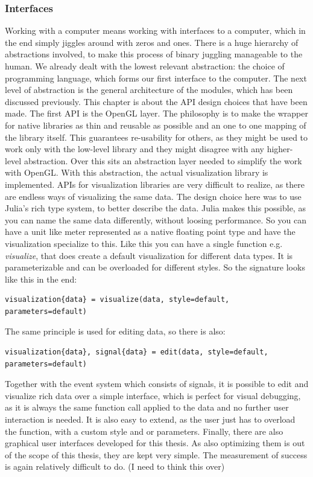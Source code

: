 \subsubsection{Interfaces}
Working with a computer means working with interfaces to a computer, which in the end simply jiggles around with zeros and ones. There is a huge hierarchy of abstractions involved, to make this process of binary juggling manageable to the human.
We already dealt with the lowest relevant abstraction: the choice of programming language, which forms our first interface to the computer.
The next level of abstraction is the general architecture of the modules, which has been discussed previously. 
This chapter is about the API design choices that have been made.
The first API is the \ac{OpenGL} layer. The philosophy is to make the wrapper for native libraries as thin and reusable as possible and an one to one mapping of the library itself.
This guarantees re-usability for others, as they might be used to work only with the low-level library and they might disagree with any higher-level abstraction.
Over this sits an abstraction layer needed to simplify the work with \ac{OpenGL}.
With this abstraction, the actual visualization library is implemented.
APIs for visualization libraries are very difficult to realize, as there are endless ways of visualizing the same data.
The design choice here was to use Julia's rich type system, to better describe the data. 
Julia makes this possible, as you can name the same data differently, without loosing performance.
So you can have a unit like meter represented as a native floating point type and have the visualization specialize to this.
Like this you can have a single function e.g. \textit{visualize}, that does create a default visualization for different data types.
It is parameterizable and can be overloaded for different styles.
So the signature looks like this in the end:
\begin{lstlisting}
visualization{data} = visualize(data, style=default, parameters=default)
\end{lstlisting}
The same principle is used for editing data, so there is also:
\begin{lstlisting}
visualization{data}, signal{data} = edit(data, style=default, parameters=default)
\end{lstlisting}
Together with the event system which consists of signals, it is possible to edit and visualize rich data over a simple interface, which is perfect for visual debugging, as it is always the same function call applied to the data and no further user interaction is needed.
It is also easy to extend, as the user just has to overload the function, with a custom style and or parameters.
Finally, there are also graphical user interfaces developed for this thesis. As also optimizing them is out of the scope of this thesis, they are kept very simple.
The measurement of success is again relatively difficult to do. (I need to think this over)



